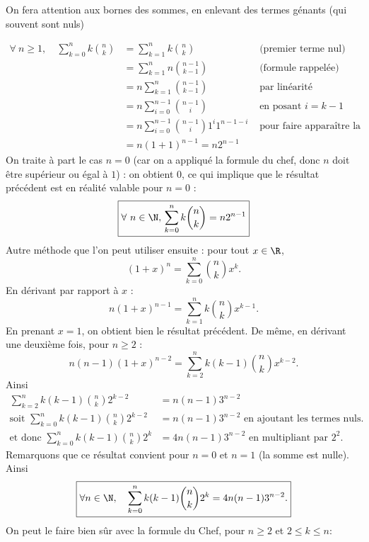 {{\begin{remarque}
 On fera attention aux bornes des sommes, en enlevant des termes génants (qui souvent sont nuls)
\end{remarque}
  \begin{align*}
  \forall~n\geq 1,\quad \sum_{k=0}^n k\binom{n}{k} &= \sum_{k=1}^n k\binom{n}{k} &\text{ (premier terme nul)}\\
      &= \sum_{k=1}^{n} n\binom{n-1}{k-1}  & \text{ (formule rappelée)}\\
      &= n\sum_{k=1}^{n} \binom{n-1}{k-1}  &\text{ par linéarité} \\
      &= n\sum_{i=0}^{n-1} \binom{n-1}{i}  &\text{ en posant } i=k-1 \\
      &= n\sum_{i=0}^{n-1} \binom{n-1}{i}1^{i}1^{n-1-i} &\text{ pour faire apparaître la formule du binôme}\\
      &= n\left(1+1\right)^{n-1} = n2^{n-1}
    \end{align*}
On traite à part le cas $n=0$  (car on a appliqué la formule du chef, donc $n$ doit être supérieur ou égal à $1$) : on obtient  $0$, ce qui implique que le résultat précédent est en réalité valable pour $n=0$ : \[ \boxed{\forall~n\in \N,\, \sum_{k=0}^n k\binom{n}{k}=n2^{n-1}} \]
Autre méthode que l'on peut utiliser ensuite : pour tout $x\in \R$, \[ (1+x)^n = \sum_{k=0}^n \binom{n}{k}x^k.\]
En dérivant par rapport à $x$ :
\[ n(1+x)^{n-1} = \sum_{k=1}^n k\binom{n}{k}x^{k-1}.\]
En prenant $x=1$, on obtient bien le résultat précédent. De même, en dérivant une deuxième fois, pour $n\geq 2$ :
\[ n(n-1)(1+x)^{n-2} = \sum_{k=2}^n k(k-1)\binom{n}{k}x^{k-2}.\]
Ainsi
\begin{align*}
\sum_{k=2}^n k(k-1)\binom{n}{k}2^{k-2} &= n(n-1)3^{n-2} \\
\text{soit } \sum_{k=0}^n k(k-1)\binom{n}{k}2^{k-2} &= n(n-1)3^{n-2} \text{ en ajoutant les termes nuls.}\\
\text{et donc } \sum_{k=0}^n k(k-1)\binom{n}{k}2^{k} &= 4n(n-1)3^{n-2} \text{ en multipliant par $2^2$.}
\end{align*}
Remarquons que ce résultat convient pour $n=0$ et $n=1$ (la somme est nulle). Ainsi
\[ \boxed{\forall n\in \N,\quad \sum_{k=0}^n k(k-1)\binom{n}{k} 2^k = 4n(n-1)3^{n-2}.}\]
On peut le faire bien sûr avec la formule du Chef, pour $n\geq 2$ et $2\leq k \leq n$: 

}}
